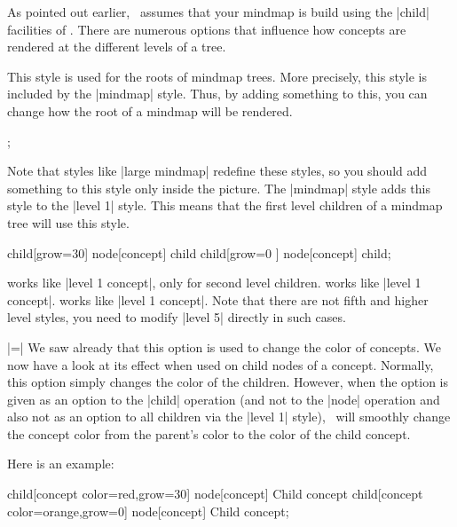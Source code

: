 As pointed out earlier, \tikzname\ assumes that your mindmap is build
using the |child| facilities of \tikzname. There are numerous options
that influence how concepts are rendered at the different levels of a
tree. 

\begin{itemize}
  This style is used for the roots of mindmap trees. More precisely,
  this style is included by the |mindmap| style. Thus, by adding
  something to this, you can change how the root of a mindmap will be
  rendered.
\begin{codeexample}[]
\tikz
  [root concept/.append style={concept color=blue!80,minimum size=3.5cm},
   mindmap]
  ;
\end{codeexample}

  Note that styles like |large mindmap| redefine these styles, so you
  should add something to this style only inside the picture.
  The |mindmap| style adds this style to the |level 1| style. This
  means that the first level children of a mindmap tree will use this
  style. 
\begin{codeexample}[]
\tikz
  [root concept/.append style={concept color=blue!80},
   level 1 concept/.append style={concept color=red!50},
   mindmap]
    child[grow=30] {node[concept] {child}}
    child[grow=0 ] {node[concept] {child}};
\end{codeexample}
  works like |level 1 concept|, only for second level children. 
  works like |level 1 concept|.
  works like |level 1 concept|. Note that there are not fifth and
  higher level styles, you need to modify |level 5| directly in such
  cases. 
  
  |=|
  We saw already that this option is used to change the color of
  concepts. We now have a look at its effect when used on child nodes
  of a concept. Normally, this option simply changes the color of the
  children. However, when the option is given as an option to the
  |child| operation (and not to the |node| operation and also not as
  an option to all children via the |level 1| style), \tikzname\ will
  smoothly change the concept color from the parent's color to the
  color of the child concept. 

  Here is an example:
\begin{codeexample}[]
\tikz[mindmap,concept color=blue!80]
    child[concept color=red,grow=30] {node[concept] {Child concept}}
    child[concept color=orange,grow=0]  {node[concept] {Child concept}};
\end{codeexample}


\end{itemize}
